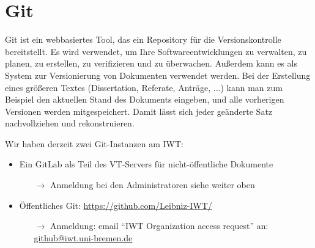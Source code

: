 \section{Git}

Git ist ein webbasiertes Tool, das ein Repository für die Versionskontrolle
bereitstellt. Es wird verwendet, um Ihre Softwareentwicklungen zu verwalten, zu
planen, zu erstellen, zu verifizieren und zu überwachen. Außerdem kann es als
System zur Versionierung von Dokumenten verwendet werden. Bei der Erstellung
eines größeren Textes (Dissertation, Referate, Anträge, ...) kann man zum
Beispiel den aktuellen Stand des Dokuments eingeben, und alle vorherigen
Versionen werden mitgespeichert. Damit lässt sich jeder geänderte Satz
nachvollziehen und rekonstruieren.

Wir haben derzeit zwei Git-Instanzen am IWT:
\begin{itemize}
  \item Ein GitLab als Teil des VT-Servers für nicht-öffentliche Dokumente
        \begin{itemize}
          \item[$\rightarrow$] Anmeldung bei den Administratoren siehe weiter oben
        \end{itemize}
  \item Öffentliches Git: \url{https://github.com/Leibniz-IWT/}
        \begin{itemize}
          \item[$\rightarrow$] Anmeldung: email “IWT Organization access
                               request” an: 
                               \href{mailto:github@iwt.uni-bremen.de}%
                               {github@iwt.uni-bremen.de}
        \end{itemize}
\end{itemize}
